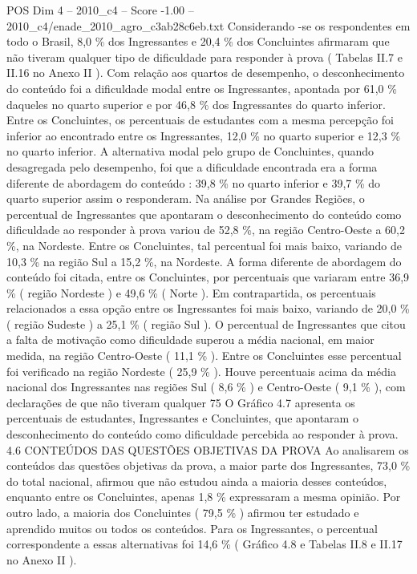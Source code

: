 \begin{textsample}{POS Dim 4 – 2010\_c4 – Score -1.00 – 2010\_c4/enade\_2010\_agro\_c3ab28c6eb.txt}
Considerando -se os respondentes em todo o Brasil, 8,0 \% dos Ingressantes e 20,4 \% dos Concluintes afirmaram que não tiveram qualquer tipo de dificuldade para responder à prova ( Tabelas II.7 e II.16 no Anexo II ).
Com relação aos quartos de desempenho, o desconhecimento do conteúdo foi a dificuldade modal entre os Ingressantes, apontada por 61,0 \% daqueles no quarto superior e por 46,8 \% dos Ingressantes do quarto inferior.
Entre os Concluintes, os percentuais de estudantes com a mesma percepção foi inferior ao encontrado entre os Ingressantes, 12,0 \% no quarto superior e 12,3 \% no quarto inferior.
A alternativa modal pelo grupo de Concluintes, quando desagregada pelo desempenho, foi que a dificuldade encontrada era a forma diferente de abordagem do conteúdo : 39,8 \% no quarto inferior e 39,7 \% do quarto superior assim o responderam.
Na análise por Grandes Regiões, o percentual de Ingressantes que apontaram o desconhecimento do conteúdo como dificuldade ao responder à prova variou de 52,8 \%, na região Centro-Oeste a 60,2 \%, na Nordeste.
Entre os Concluintes, tal percentual foi mais baixo, variando de 10,3 \% na região Sul a 15,2 \%, na Nordeste.
A forma diferente de abordagem do conteúdo foi citada, entre os Concluintes, por percentuais que variaram entre 36,9 \% ( região Nordeste ) e 49,6 \% ( Norte ).
Em contrapartida, os percentuais relacionados a essa opção entre os Ingressantes foi mais baixo, variando de 20,0 \% ( região Sudeste ) a 25,1 \% ( região Sul ).
O percentual de Ingressantes que citou a falta de motivação como dificuldade superou a média nacional, em maior medida, na região Centro-Oeste ( 11,1 \% ).
Entre os Concluintes esse percentual foi verificado na região Nordeste ( 25,9 \% ).
Houve percentuais acima da média nacional dos Ingressantes nas regiões Sul ( 8,6 \% ) e Centro-Oeste ( 9,1 \% ), com declarações de que não tiveram qualquer 75 O Gráfico 4.7 apresenta os percentuais de estudantes, Ingressantes e Concluintes, que apontaram o desconhecimento do conteúdo como dificuldade percebida ao responder à prova. 4.6 CONTEÚDOS DAS QUESTÕES OBJETIVAS DA PROVA Ao analisarem os conteúdos das questões objetivas da prova, a maior parte dos Ingressantes, 73,0 \% do total nacional, afirmou que não estudou ainda a maioria desses conteúdos, enquanto entre os Concluintes, apenas 1,8 \% expressaram a mesma opinião.
Por outro lado, a maioria dos Concluintes ( 79,5 \% ) afirmou ter estudado e aprendido muitos ou todos os conteúdos.
Para os Ingressantes, o percentual correspondente a essas alternativas foi 14,6 \% ( Gráfico 4.8 e Tabelas II.8 e II.17 no Anexo II ).

\end{textsample}

